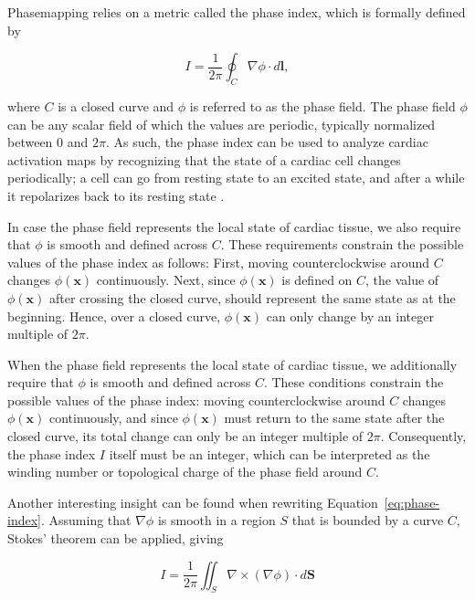 \documentclass[twocolumn]{article}
\begin{document}
Phasemapping relies on a metric called the phase index,
which is formally defined by

\begin{equation}
  I = \frac{1}{2\pi}\oint_C \nabla \phi \cdot d\bm{l} ,
  \label{eq:phase-index}
\end{equation}

\noindent where $C$ is a closed curve
and $\phi$ is referred to as the phase field.
The phase field $\phi$ can be any scalar field of which the values are periodic,
typically normalized between $0$ and $2\pi$.
As such, the phase index can be used to analyze cardiac activation maps
by recognizing that the state of a cardiac cell changes periodically;
a cell can go from resting state to an excited state,
and after a while it repolarizes back to its resting state \cite{1984theoretical_scrollwaves_chemical_winfree}.

In case the phase field represents the local state of cardiac tissue,
we also require that $\phi$ is smooth and defined across $C$.
These requirements constrain the possible values of the phase index as follows:
First, moving counterclockwise around $C$ changes $\phi(\bm{x})$ continuously.
Next, since $\phi(\bm{x})$ is defined on $C$,
the value of $\phi(\bm{x})$ after crossing the closed curve,
should represent the same state as at the beginning.
Hence, over a closed curve,
$\phi(\bm{x})$ can only change by an integer multiple of $2\pi$.

When the phase field represents the local state of cardiac tissue,
we additionally require that $\phi$ is smooth and defined across $C$.
These conditions constrain the possible values of the phase index:
moving counterclockwise around $C$ changes $\phi(\bm{x})$ continuously,
and since $\phi(\bm{x})$ must return to the same state after the closed curve,
its total change can only be an integer multiple of $2\pi$.
Consequently, the phase index $I$ itself must be an integer,
which can be interpreted as the winding number or topological charge of the phase field around $C$.

Another interesting insight can be found when rewriting Equation~\ref{eq:phase-index}.
Assuming that $\nabla\phi$ is smooth in a region $S$ that is bounded by a curve $C$,
Stokes' theorem can be applied, giving

\begin{equation}
  I = \frac{1}{2\pi} \iint_S \nabla \times (\nabla \phi) \cdot d\bm{S}
  \label{eq:phase-index-stokes}
\end{equation}
\end{document}
